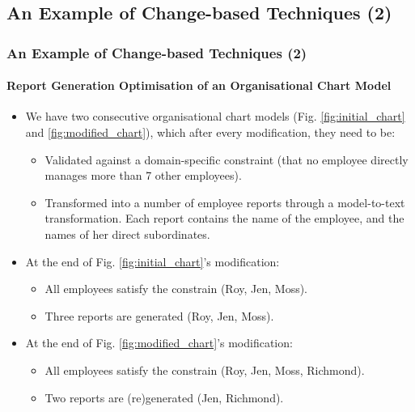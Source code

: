 \documentclass{beamer}
\begin{document}
\begin{frame}
\section{An Example of Change-based Techniques (2)}
\frametitle{An Example of Change-based Techniques (2)}
\label{sec:An example_of_change-based_techniques_2}
\framesubtitle{Report Generation Optimisation of an Organisational Chart Model}
\begin{itemize}
\item We have two consecutive organisational chart models (Fig. \ref{fig:initial_chart} and \ref{fig:modified_chart}), which after every modification, they need to be:
\begin{itemize}
\item Validated against a domain-specific constraint (that no employee directly manages more than 7 other employees).
\item Transformed into a number of employee reports through a model-to-text transformation. Each report contains the name of the employee, and the names of her direct subordinates.
\end{itemize}
\item At the end of Fig. \ref{fig:initial_chart}'s modification:
\begin{itemize}
\item All employees satisfy the constrain (Roy, Jen, Moss).
\item Three reports are generated (Roy, Jen, Moss).
\end{itemize}
\item At the end of Fig. \ref{fig:modified_chart}'s modification:
    \begin{itemize}
    \item All employees satisfy the constrain (Roy, Jen, Moss, Richmond).
    \item Two reports are (re)generated (Jen, Richmond).
\end{itemize}
\end{itemize}
\end{frame}
\end{document}
